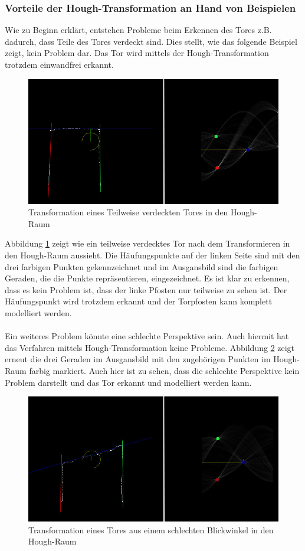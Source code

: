 \documentclass[a4paper,12pt]{article}
\begin{document}
\subsubsection{Vorteile der Hough-Transformation an Hand von Beispielen}
Wie zu Beginn erklärt, entstehen Probleme beim Erkennen des Tores z.B. dadurch, dass
Teile des Tores verdeckt sind. Dies stellt, wie das folgende Beispiel zeigt, kein Problem dar.
Das Tor wird mittels der Hough-Transformation trotzdem einwandfrei erkannt.
\begin{figure}[H]
    \includegraphics[scale=0.5]{hough_beispiel.jpg}
    \caption{Transformation eines Teilweise verdeckten Tores in den Hough-Raum}
    \label{fig:houg-beispiel1}
\end{figure}
Abbildung \ref{fig:houg-beispiel1} zeigt wie ein teilweise verdecktes Tor
nach dem Transformieren in den Hough-Raum aussieht. Die Häufungspunkte auf
der linken Seite sind mit den drei farbigen Punkten gekennzeichnet und
im Ausgansbild sind die farbigen Geraden, die die Punkte repräsentieren,
eingezeichnet. Es ist klar zu erkennen, dass es kein Problem ist,
dass der linke Pfosten nur teilweise zu sehen ist. Der Häufungspunkt
wird trotzdem erkannt und der Torpfosten kann komplett modelliert werden. \\
\\
Ein weiteres Problem könnte eine schlechte Perspektive sein. Auch hiermit hat das Verfahren
mittels Hough-Transformation keine Probleme. Abbildung \ref{fig:houg-beispiel2} zeigt erneut die
drei Geraden im Ausgansbild mit den zugehörigen Punkten im Hough-Raum farbig markiert.
Auch hier ist zu sehen, dass die schlechte Perspektive kein Problem darstellt
und das Tor erkannt und modelliert werden kann.
\begin{figure}[H]
    \includegraphics[scale=0.5]{hough_beispiel2.jpg}
    \caption{Transformation eines Tores aus einem schlechten Blickwinkel in den Hough-Raum}
    \label{fig:houg-beispiel2}
\end{figure}
\end{document}
